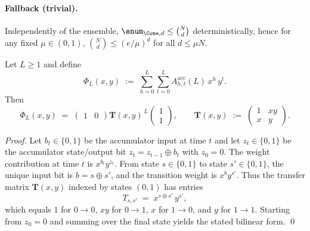 \paragraph{Fallback (trivial).}
Independently of the ensemble, $\enum_{\Cone,d}\le \binom{N}{d}$ deterministically, hence for any fixed $\mu\in(0,1)$,
$\binom{N}{d}\le (e/\mu)^d$ for all $d\le \mu N$.

%

\begin{lemma}
\label{lem:acc-transfer-matrix}
Let $L\ge 1$ and define
\[
\Phi_L(x,y)
\;:=\;
\sum_{h=0}^{L}\sum_{t=0}^{L} A^{\mathrm{acc}}_{h,t}(L)\, x^{h}\, y^{t}.
\]
Then
\[
\Phi_L(x,y)
\;=\;
\begin{pmatrix}1&0\end{pmatrix}
\mathbf T(x,y)^{\,L}
\begin{pmatrix}1\\[2pt]1\end{pmatrix},
\qquad
\mathbf T(x,y)
\;:=\;
\begin{pmatrix}
1 & x y\\
x & y
\end{pmatrix}.
\]
\end{lemma}

\begin{proof}
Let $b_t\in\{0,1\}$ be the accumulator input at time $t$ and let $z_t\in\{0,1\}$ be the accumulator state/output bit
$z_t=z_{t-1}\oplus b_t$ with $z_0=0$.
The weight contribution at time $t$ is $x^{b_t}y^{z_t}$.
From state $s\in\{0,1\}$ to state $s'\in\{0,1\}$, the unique input bit is $b=s\oplus s'$, and the transition weight is
$x^{b}y^{s'}$.
Thus the transfer matrix $\mathbf T(x,y)$ indexed by states $(0,1)$ has entries
\[
T_{s,s'} \;=\; x^{s\oplus s'}\, y^{s'},
\]
which equals $1$ for $0\to 0$, $xy$ for $0\to 1$, $x$ for $1\to 0$, and $y$ for $1\to 1$.
Starting from $z_0=0$ and summing over the final state yields the stated bilinear form.
\qed
\end{proof}

